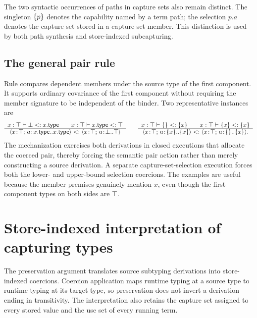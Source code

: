\documentclass[acmsmall,screen,nonacm]{acmart}
\begin{document}
The two syntactic occurrences of paths in capture sets also remain distinct.
The singleton \(\{{p}\}\) denotes the capability named by a term path; the
selection \(p.a\) denotes the capture set stored in a capture-set member. This
distinction is used by both path synthesis and store-indexed subcapturing.

\subsection{The general pair rule}

Rule  compares dependent members under the source type of
the first component.  It supports ordinary covariance of the first component
without requiring the member signature to be independent of the binder.  Two
representative instances are
\[
\begin{array}{c}
 x:\top\vdash \bot<:\sing x
 \qquad
 x:\top\vdash \sing x<:\top
 \\[-1pt]
 \hline
 \pairshape{x}{\top}{a}{\sing x..\sing x}
 <: \pairshape{x}{\top}{a}{\bot..\top}
\end{array}
\qquad
\begin{array}{c}
 x:\top\vdash \set{}<:\set x
 \qquad
 x:\top\vdash \set x<:\set x
 \\[-1pt]
 \hline
 \pairshape{x}{\top}{a}{\set x..\set x}
 <: \pairshape{x}{\top}{a}{\set{}..\set x}.
\end{array}
\]
The mechanization exercises both derivations in closed executions that
allocate the coerced pair, thereby forcing the semantic pair action rather
than merely constructing a source derivation. A separate capture-set-selection
execution forces both the lower- and upper-bound selection coercions.  The
examples are useful because the member premises genuinely mention \(x\), even
though the first-component types on both sides are \(\top\).

\section{Store-indexed interpretation of capturing types}
\label{sec:semantics}

The preservation argument translates source subtyping derivations into
store-indexed coercions. Coercion application maps runtime typing at a source
type to runtime typing at its target type, so preservation does not invert a
derivation ending in transitivity. The interpretation also retains the
capture set assigned to every stored value and the use set of every running
term.
\end{document}
